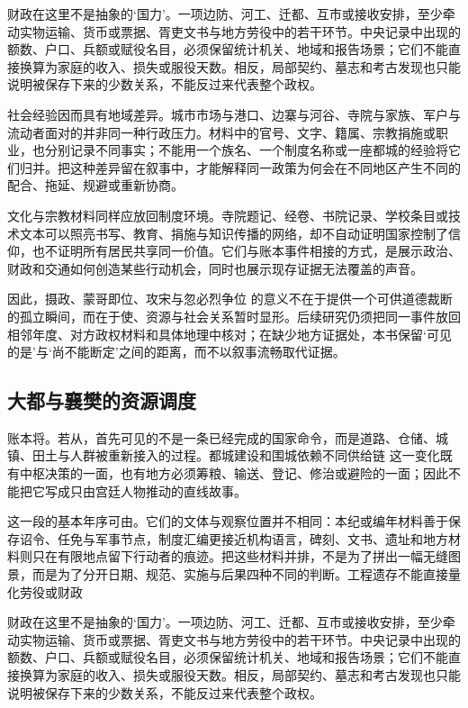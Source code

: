 财政在这里不是抽象的‘国力’。一项边防、河工、迁都、互市或接收安排，至少牵动实物运输、货币或票据、胥吏文书与地方劳役中的若干环节。中央记录中出现的额数、户口、兵额或赋役名目，必须保留统计机关、地域和报告场景；它们不能直接换算为家庭的收入、损失或服役天数。相反，局部契约、墓志和考古发现也只能说明被保存下来的少数关系，不能反过来代表整个政权。

社会经验因而具有地域差异。城市市场与港口、边寨与河谷、寺院与家族、军户与流动者面对的并非同一种行政压力。材料中的官号、文字、籍属、宗教捐施或职业，也分别记录不同事实；不能用一个族名、一个制度名称或一座都城的经验将它们归并。把这种差异留在叙事中，才能解释同一政策为何会在不同地区产生不同的配合、拖延、规避或重新协商。

文化与宗教材料同样应放回制度环境。寺院题记、经卷、书院记录、学校条目或技术文本可以照亮书写、教育、捐施与知识传播的网络，却不自动证明国家控制了信仰，也不证明所有居民共享同一价值。它们与账本事件相接的方式，是展示政治、财政和交通如何创造某些行动机会，同时也展示现存证据无法覆盖的声音。

因此，摄政、蒙哥即位、攻宋与忽必烈争位 的意义不在于提供一个可供道德裁断的孤立瞬间，而在于使、资源与社会关系暂时显形。后续研究仍须把同一事件放回相邻年度、对方政权材料和具体地理中核对；在缺少地方证据处，本书保留‘可见的是’与‘尚不能断定’之间的距离，而不以叙事流畅取代证据。

\subsection{大都与襄樊的资源调度}

账本将。若从，首先可见的不是一条已经完成的国家命令，而是道路、仓储、城镇、田土与人群被重新接入的过程。都城建设和围城依赖不同供给链 这一变化既有中枢决策的一面，也有地方必须筹粮、输送、登记、修治或避险的一面；因此不能把它写成只由宫廷人物推动的直线故事。

这一段的基本年序可由。它们的文体与观察位置并不相同：本纪或编年材料善于保存诏令、任免与军事节点，制度汇编更接近机构语言，碑刻、文书、遗址和地方材料则只在有限地点留下行动者的痕迹。把这些材料并排，不是为了拼出一幅无缝图景，而是为了分开日期、规范、实施与后果四种不同的判断。工程遗存不能直接量化劳役或财政

财政在这里不是抽象的‘国力’。一项边防、河工、迁都、互市或接收安排，至少牵动实物运输、货币或票据、胥吏文书与地方劳役中的若干环节。中央记录中出现的额数、户口、兵额或赋役名目，必须保留统计机关、地域和报告场景；它们不能直接换算为家庭的收入、损失或服役天数。相反，局部契约、墓志和考古发现也只能说明被保存下来的少数关系，不能反过来代表整个政权。


